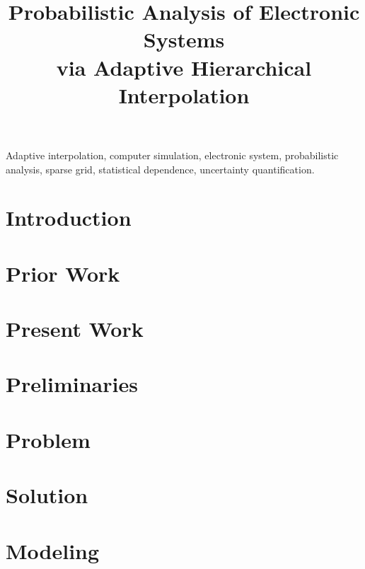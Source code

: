 \documentclass[journal]{IEEEtran}
\title{
  Probabilistic Analysis of Electronic Systems\\
  via Adaptive Hierarchical Interpolation
}
\author{}
\begin{document}
  \maketitle

  \begin{abstract}
    
  \end{abstract}

  \begin{IEEEkeywords}
    Adaptive interpolation,
    computer simulation,
    electronic system,
    probabilistic analysis,
    sparse grid,
    statistical dependence,
    uncertainty quantification.
  \end{IEEEkeywords}


  \section{Introduction} 
  

  \section{Prior Work} 
  

  \section{Present Work} 
  

  \section{Preliminaries} 
  

  \section{Problem} 
  

  \section{Solution} 
  

  \section{Modeling} 
  
\end{document}
